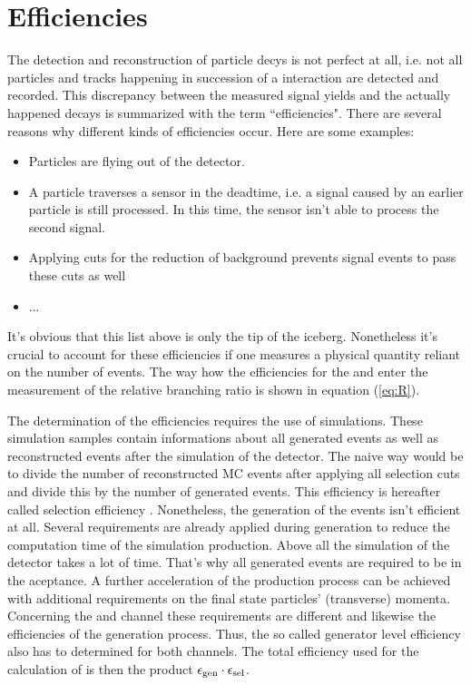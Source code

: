\chapter{Efficiencies}
\label{sec:Efficiencies}

The detection and reconstruction of particle decys is not perfect at all, i.e. not all particles and tracks happening in succession of a \proton\proton interaction are detected and recorded.
This discrepancy between the measured signal yields and the actually happened decays is summarized with the term ``efficiencies".
There are several reasons why different kinds of efficiencies occur.
Here are some examples:
\begin{itemize}
    \item Particles are flying out of the detector.
    \item A particle traverses a sensor in the deadtime, i.e. a signal caused by an earlier particle is still processed. 
          In this time, the sensor isn't able to process the second signal.
    \item Applying cuts for the reduction of background prevents signal events to pass these cuts as well
    \item ...
\end{itemize}
It's obvious that this list above is only the tip of the iceberg.
Nonetheless it's crucial to account for these efficiencies if one measures a physical quantity reliant on the number of events.
The way how the efficiencies for the \LbToDpmunuX and \LbToLcmunu enter the measurement of the relative branching ratio \R is shown in equation (\ref{eq:R}).

The determination of the efficiencies requires the use of simulations.
These simulation samples contain informations about all generated events as well as reconstructed events after the simulation of the detector. 
The naive way would be to divide the number of reconstructed MC events after applying all selection cuts and divide this by the number of generated events. 
This efficiency is hereafter called selection efficiency \effSel.
Nonetheless, the generation of the events isn't efficient at all. 
Several requirements are already applied during generation to reduce the computation time of the simulation production.
Above all the simulation of the detector takes a lot of time.
That's why all generated events are required to be in the \lhcb aceptance.
A further acceleration of the production process can be achieved with additional requirements on the final state particles' (transverse) momenta.
Concerning the \LbToDpmunuX and \LbToLcmunu channel these requirements are different and likewise the efficiencies of the generation process.
Thus, the so called generator level efficiency \effGen also has to determined for both channels. 
The total efficiency used for the calculation of \R is then the product $\epsilon_{\text{gen}} \cdot \epsilon_{\text{sel}}$.

